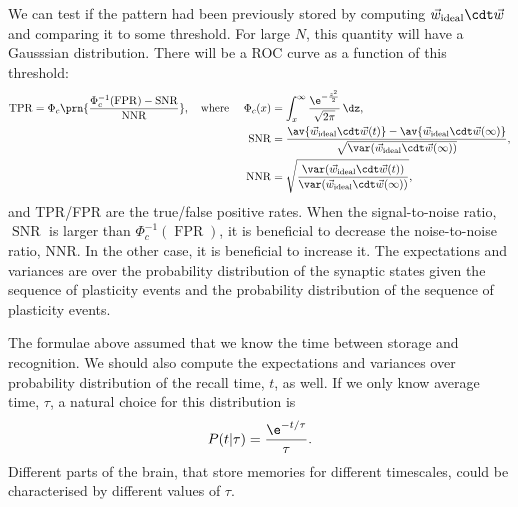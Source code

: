 \documentclass[12pt]{article}
\newcommand{\inv}{^{-1}}
\newcommand{\syn}{\vec{w}}
\newcommand{\synid}{\syn_\text{ideal}}
\DeclareMathOperator{\snr}{SNR}
\begin{document}
We can test if the pattern had been previously stored by computing $\synid\cdt\syn$ and comparing it to some threshold.
For large $N$, this quantity will have a Gausssian distribution.
There will be a ROC curve as a function of this threshold:
%
\begin{equation}\label{eq:ROC}
  \begin{aligned}
  \operatorname{TPR} &= \Phi_c \prn{ \frac{ \Phi_c\inv(\operatorname{FPR}) - \snr }{ \operatorname{NNR} } },
  \quad\text{where } &
    \Phi_c(x) &= \int_x^\infty \frac{ \e^{-\frac{z^2}{2}} }{ \sqrt{2\pi} }\, \dz, \\&&
    \snr &= \frac{ \av{\synid\cdt\syn(t)} - \av{\synid\cdt\syn(\infty)} }{ \sqrt{\var(\synid\cdt\syn(\infty))}}, \\&&
    \operatorname{NNR} &= \sqrt{\frac{ \var(\synid\cdt\syn(t)) }{ \var(\synid\cdt\syn(\infty)) }},
  \end{aligned}
\end{equation}
%
and TPR/FPR are the true/false positive rates.
When the signal-to-noise ratio, $\snr$ is larger than $\Phi_c\inv(\operatorname{FPR})$, it is beneficial to decrease the noise-to-noise ratio, NNR.
In the other case, it is beneficial to increase it.
The expectations and variances are over the probability distribution of the synaptic states given the sequence of plasticity events and the probability distribution of the sequence of plasticity events.

The formulae above assumed that we know the time between storage and recognition.
We should also compute the expectations and variances over probability distribution of the recall time, $t$, as well.
If we only know average time, $\tau$, a natural choice for this distribution is
%
\begin{equation}\label{eq:recogtime}
  P(t\vert\tau) = \frac{\e^{-t/\tau}}{\tau}.
\end{equation}
%
Different parts of the brain, that store memories for different timescales, could be characterised by different values of $\tau$.
















\end{document}
